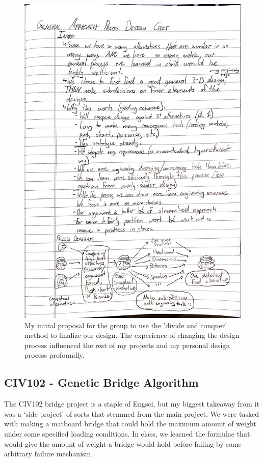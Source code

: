 \documentclass[a4paper,12pt]{article}
\begin{document}
\begin{figure}[H]
\centering
\includegraphics[width=1\textwidth]{img/image004.jpg}
\caption{My initial proposal for the group to use the 'divide and conquer' method to finalize our design. The experience of changing the design process influenced the rest of my projects and my personal design process profoundly.}
\label{}
\end{figure}


\subsection{CIV102 - Genetic Bridge Algorithm}
The CIV102 bridge project is a staple of Engsci, but my biggest takeaway from it was a ‘side project’ of sorts that stemmed from the main project. We were tasked with making a matboard bridge that could hold the maximum amount of weight under some specified loading conditions. In class, we learned the formulae that would give the amount of weight a bridge would hold before failing by some arbitrary failure mechanism.
\end{document}

